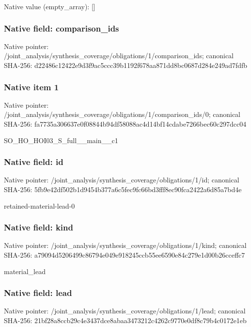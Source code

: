 \documentclass[10pt,a4paper]{article}
\begin{document}
Native value (empty\_\allowbreak{}array): []

\subsubsection{Native field: comparison\_\allowbreak{}ids}
Native pointer: /joint\_\allowbreak{}analysis/synthesis\_\allowbreak{}coverage/obligations/1/comparison\_\allowbreak{}ids; canonical SHA-256: d22486c12422e9d3f9ac5ccc39b1192f678aa871dd8bc0687d284e249ad7fdfb

\subsubsection{Native item 1}
Native pointer: /joint\_\allowbreak{}analysis/synthesis\_\allowbreak{}coverage/obligations/1/comparison\_\allowbreak{}ids/0; canonical SHA-256: fa7735a306637e0f08844b94df58088ac4d14bf14cdabe7266bec60c297dcc04

\begingroup\raggedright\sloppy SO\_\allowbreak{}HO\_\allowbreak{}HOI03\_\allowbreak{}S\_\allowbreak{}full\_\allowbreak{}\_\allowbreak{}main\_\allowbreak{}\_\allowbreak{}c1\par\endgroup

\subsubsection{Native field: id}
Native pointer: /joint\_\allowbreak{}analysis/synthesis\_\allowbreak{}coverage/obligations/1/id; canonical SHA-256: 5fb9e42df502b1d9454b377a6c5fec9fc66bd3fff8ec90fca2422a6d85a7bd4e

\begingroup\raggedright\sloppy retained-material-lead-0\par\endgroup

\subsubsection{Native field: kind}
Native pointer: /joint\_\allowbreak{}analysis/synthesis\_\allowbreak{}coverage/obligations/1/kind; canonical SHA-256: a79094d5206499c86794e049e918245ccb55ee6590e84c279e1d00b26cceffc7

\begingroup\raggedright\sloppy material\_\allowbreak{}lead\par\endgroup

\subsubsection{Native field: lead}
Native pointer: /joint\_\allowbreak{}analysis/synthesis\_\allowbreak{}coverage/obligations/1/lead; canonical SHA-256: 21bf28a8ccb29c4e3437dce8abaa3473212c4262c9770e0df8c79b4c0172e1eb
\end{document}
